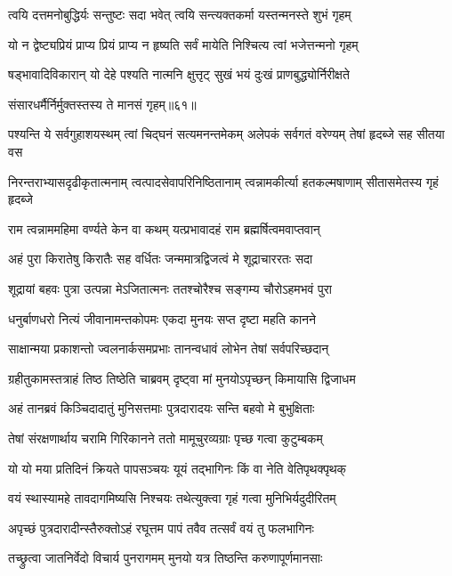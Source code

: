 \twolineshloka
{त्वयि दत्तमनोबुद्धिर्यः सन्तुष्टः सदा भवेत्}
{त्वयि सन्त्यक्तकर्मा यस्तन्मनस्ते शुभं गृहम्} %

\twolineshloka
{यो न द्वेष्ट्यप्रियं प्राप्य प्रियं प्राप्य न हृष्यति}
{सर्वं मायेति निश्चित्य त्वां भजेत्तन्मनो गृहम्} %

\twolineshloka
{षड्भावादिविकारान् यो देहे पश्यति नात्मनि}
{क्षुत्तृट् सुखं भयं दुःखं प्राणबुद्ध्योर्निरीक्षते} %

{संसारधर्मैर्निर्मुक्तस्तस्य ते मानसं गृहम्॥६१॥} %


\fourlineindentedshloka
{पश्यन्ति ये सर्वगुहाशयस्थम्}
{त्वां चिद्घनं सत्यमनन्तमेकम्}
{अलेपकं सर्वगतं वरेण्यम्}
{तेषां हृदब्जे सह सीतया वस} %

\fourlineindentedshloka
{निरन्तराभ्यासदृढीकृतात्मनाम्}
{त्वत्पादसेवापरिनिष्ठितानाम्}
{त्वन्नामकीर्त्या हतकल्मषाणाम्}
{सीतासमेतस्य गृहं हृदब्जे} %

\twolineshloka
{राम त्वन्नाममहिमा वर्ण्यते केन वा कथम्}
{यत्प्रभावादहं राम ब्रह्मर्षित्वमवाप्तवान्} %

\twolineshloka
{अहं पुरा किरातेषु किरातैः सह वर्धितः}
{जन्ममात्रद्विजत्वं मे शूद्राचाररतः सदा} %

\twolineshloka
{शूद्रायां बहवः पुत्रा उत्पन्ना मेऽजितात्मनः}
{ततश्चोरैश्च सङ्गम्य चौरोऽहमभवं पुरा} %

\twolineshloka
{धनुर्बाणधरो नित्यं जीवानामन्तकोपमः}
{एकदा मुनयः सप्त दृष्टा महति कानने} %

\twolineshloka
{साक्षान्मया प्रकाशन्तो ज्वलनार्कसमप्रभाः}
{तानन्वधावं लोभेन तेषां सर्वपरिच्छदान्} %

\twolineshloka
{ग्रहीतुकामस्तत्राहं तिष्ठ तिष्ठेति चाब्रवम्}
{दृष्ट्वा मां मुनयोऽपृच्छन् किमायासि द्विजाधम} %

\twolineshloka
{अहं तानब्रवं किञ्चिदादातुं मुनिसत्तमाः}
{पुत्रदारादयः सन्ति बहवो मे बुभुक्षिताः} %

\twolineshloka
{तेषां संरक्षणार्थाय चरामि गिरिकानने}
{ततो मामूचुरव्यग्राः पृच्छ गत्वा कुटुम्बकम्} %

\twolineshloka
{यो यो मया प्रतिदिनं क्रियते पापसञ्चयः}
{यूयं तद्भागिनः किं वा नेति वेतिपृथक्पृथक्} %

\twolineshloka
{वयं स्थास्यामहे तावदागमिष्यसि निश्चयः}
{तथेत्युक्त्वा गृहं गत्वा मुनिभिर्यदुदीरितम्} %

\twolineshloka
{अपृच्छं पुत्रदारादीन्स्तैरुक्तोऽहं रघूत्तम}
{पापं तवैव तत्सर्वं वयं तु फलभागिनः} %

\twolineshloka
{तच्छ्रुत्वा जातनिर्वेदो विचार्य पुनरागमम्}
{मुनयो यत्र तिष्ठन्ति करुणापूर्णमानसाः} %

